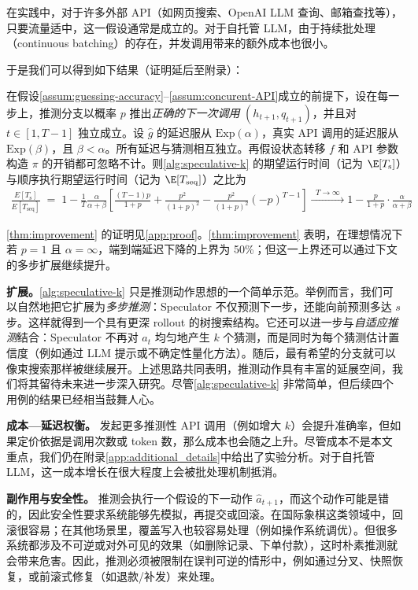 在实践中，对于许多外部 API（如网页搜索、OpenAI LLM 查询、邮箱查找等），只要流量适中，这一假设通常是成立的。对于自托管 LLM，由于持续批处理（continuous batching）的存在，并发调用带来的额外成本也很小。

于是我们可以得到如下结果（证明延后至附录）：

\begin{proposition}
\label{thm:improvement}
在假设\ref{assum:guessing-accuracy}--\ref{assum:concurent-API}成立的前提下，设在每一步上，推测分支以概率 $p$ 推出\emph{正确的下一次调用} $(h_{t+1},q_{t+1})$，并且对 $t\in[1,T-1]$ 独立成立。设 $\hat g$ 的延迟服从 $\mathrm{Exp}(\alpha)$，真实 API 调用的延迟服从 $\mathrm{Exp}(\beta)$，且 $\beta < \alpha$。所有延迟与猜测相互独立。再假设状态转移 $f$ 和 API 参数构造 $\pi$ 的开销都可忽略不计。则\cref{alg:speculative-k} 的期望运行时间（记为 $\E[T_{\mathrm{s}}]$）与顺序执行期望运行时间（记为 $\E[T_{\mathrm{seq}}]$）之比为
\begin{align*}
    \frac{E[T_{\mathrm{s}}]}{E[T_{\mathrm{seq}}]}
    \;=\;
    1 - \frac{1}{T}\frac{\alpha}{\alpha+\beta}\left[\frac{(T-1)p}{1+p}+\frac{p^2}{(1+p)^2} - \frac{p^2}{(1+p)^2}(-p)^{T-1}\right]
    \xrightarrow{\;\;T\to\infty\;\;}
    1-\frac{p}{1+p}\cdot\frac{\alpha}{\alpha+\beta}
\end{align*}
\end{proposition}

\cref{thm:improvement} 的证明见\cref{app:proof}。\cref{thm:improvement} 表明，在理想情况下若 $p=1$ 且 $\alpha=\infty$，端到端延迟下降的上界为 50\%；但这一上界还可以通过下文的多步扩展继续提升。

\textbf{扩展。}\cref{alg:speculative-k} 只是推测动作思想的一个简单示范。举例而言，我们可以自然地把它扩展为\emph{多步推测}：Speculator 不仅预测下一步，还能向前预测多达 $s$ 步。这样就得到一个具有更深 rollout 的树搜索结构。它还可以进一步与\emph{自适应推测}结合：Speculator 不再对 $a_t$ 均匀地产生 $k$ 个猜测，而是同时为每个猜测估计置信度（例如通过 LLM 提示或不确定性量化方法）。随后，最有希望的分支就可以像束搜索那样被继续展开。上述思路共同表明，推测动作具有丰富的延展空间，我们将其留待未来进一步深入研究。尽管\cref{alg:speculative-k} 非常简单，但后续四个用例的结果已经相当鼓舞人心。

\textbf{成本—延迟权衡。} 发起更多推测性 API 调用（例如增大 $k$）会提升准确率，但如果定价依据是调用次数或 token 数，那么成本也会随之上升。尽管成本不是本文重点，我们仍在附录\ref{app:additional_details}中给出了实验分析。对于自托管 LLM，这一成本增长在很大程度上会被批处理机制抵消。

\textbf{副作用与安全性。}
推测会执行一个假设的下一动作 $\hat a_{t+1}$，而这个动作可能是错的，因此安全性要求系统能够先模拟，再提交或回滚。在国际象棋这类领域中，回滚很容易；在其他场景里，覆盖写入也较容易处理（例如操作系统调优）。但很多系统都涉及不可逆或对外可见的效果（如删除记录、下单付款），这时朴素推测就会带来危害。因此，推测必须被限制在误判可逆的情形中，例如通过分叉、快照恢复，或前滚式修复（如退款/补发）来处理。
